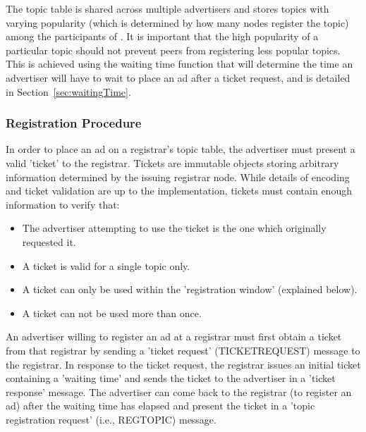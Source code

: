 The topic table is shared across multiple advertisers and stores topics with varying popularity (which is determined by how many nodes register the topic) among the participants of \sysname. 
It is important that the high popularity of a particular topic should not prevent peers from registering less popular topics. 
This is achieved using the waiting time function that will determine the time an advertiser will have to wait to place an ad after a ticket request,  and is detailed in Section~\ref{sec:waitingTime}.

\subsubsection{Registration Procedure}

In order to place an ad on a registrar's topic table,  the advertiser must present a valid 'ticket' to the registrar. 
Tickets are immutable objects storing arbitrary information determined by the issuing registrar node.  While details of encoding and ticket validation are up to the implementation, tickets must contain enough information to verify that:
\begin{itemize}
    \item The advertiser attempting to use the ticket is the one which originally requested it.
    \item A ticket is valid for a single topic only.
    \item A ticket can only be used within the 'registration window' (explained below).
    \item A ticket can not be used more than once.
\end{itemize}

An advertiser willing to register an ad at a registrar must first obtain a ticket from that registrar by sending a 'ticket request' (TICKETREQUEST) message to the registrar. In response to the ticket request, the registrar issues an initial ticket containing a 'waiting time' and sends the ticket to the advertiser in a 'ticket response' message. The advertiser can come back to the registrar (to register an ad) after the waiting time has elapsed and present the ticket in a 'topic registration request' (i.e., REGTOPIC) message.

